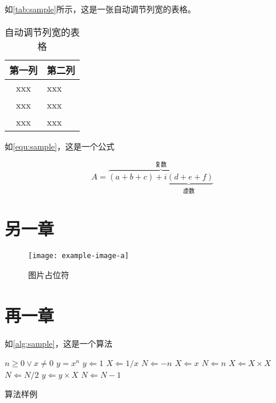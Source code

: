 \par 如\autoref{tab:sample}所示，这是一张自动调节列宽的表格。

\begin{table}[htbp]
    \caption{\label{tab:sample}自动调节列宽的表格}
    \begin{tabularx}{\linewidth}{c|X<{\centering}}
        \hline
        第一列 & 第二列 \\ \hline
        xxx & xxx \\ \hline
        xxx & xxx \\ \hline
        xxx & xxx \\ \hline
    \end{tabularx}
\end{table}


\par 如\autoref{equ:sample}，这是一个公式

\begin{equation}
    \label{equ:sample}
    A=\overbrace{(a+b+c)+\underbrace{i(d+e+f)}_{\text{虚数}}}^{\text{复数}}
\end{equation}

\chapter{另一章}


\begin{figure}[htbp]
    \centering
    \texttt{[image: example-image-a]}
    \caption{\label{fig:fig-placeholder}图片占位符}
\end{figure}

\chapter{再一章}

\par 如\autoref{alg:sample}，这是一个算法

\begin{algorithm}[H]
    \begin{algorithmic} %
        \REQUIRE $n \geq 0 \vee x \neq 0$
        \ENSURE $y = x^n$
        \STATE $y \Leftarrow 1$
            \STATE $X \Leftarrow 1 / x$
            \STATE $N \Leftarrow -n$
        \ELSE
            \STATE $X \Leftarrow x$
            \STATE $N \Leftarrow n$
        \ENDIF
                \STATE $X \Leftarrow X \times X$
                \STATE $N \Leftarrow N / 2$
            \ELSE[$N$ is odd]
                \STATE $y \Leftarrow y \times X$
                \STATE $N \Leftarrow N - 1$
            \ENDIF
        \ENDWHILE
    \end{algorithmic}
    \caption{\label{alg:sample}算法样例}
\end{algorithm}